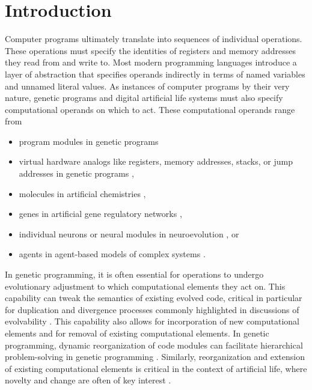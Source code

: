 \section{Introduction} \label{sec:introduction}

Computer programs ultimately translate into sequences of individual operations.
These operations must specify the identities of registers and memory addresses they read from and write to.
Most modern programming languages introduce a layer of abstraction that specifies operands indirectly in terms of named variables and unnamed literal values.
As instances of computer programs by their very nature, genetic programs and digital artificial life systems must also specify computational operands on which to act.
These computational operands range from
\begin{itemize}
  \item program modules in genetic programs \citep{spector2011tag}
  \item virtual hardware analogs like registers, memory addresses, stacks, or jump addresses in genetic programs \citep{lalejini_tag-accessed_2019,ray1991approach,ofria2004avida},
  \item molecules in artificial chemistries \citep{bagley1990spontaneous},
  \item genes in artificial gene regulatory networks \citep{banzhaf2003artificial},
  \item individual neurons or neural modules in neuroevolution \citep{reisinger2007acquiring}, or
  \item agents in agent-based models of complex systems \citep{riolo2001evolution}.
\end{itemize}

In genetic programming, it is often essential for operations to undergo evolutionary adjustment to which computational elements they act on.
This capability can tweak the semantics of existing evolved code, critical in particular for duplication and divergence processes commonly highlighted in discussions of evolvability \citep{altenberg1994evolution}.
This capability also allows for incorporation of new computational elements and for removal of existing computational elements.
In genetic programming, dynamic reorganization of code modules can facilitate hierarchical problem-solving in genetic programming \citep{Kinnear:Koza:1994:adf}.
Similarly, reorganization and extension of existing computational elements is critical in the context of artificial life, where novelty and change are often of key interest \citep{taylor2016open}.

